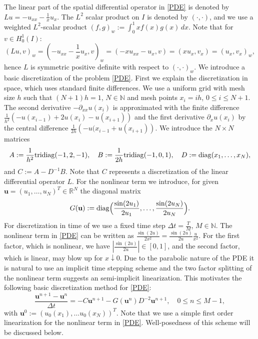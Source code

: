 \documentclass{siamltex}
\newcommand{\R}{\mathbb{R}}
\newcommand{\bu}{\mathbf u}
\begin{document}
  The linear part of the spatial differential operator in \eqref{PDE} is denoted by $Lu= - u_{xx}-\frac{1}{x}u_x$.
  The $L^2$ scalar product on $I$ is denoted by $(\cdot,\cdot)$, and  we use a weighted $L^2$-scalar product $(f,g)_w:=\int_0^1 x f(x)g(x)\, dx$.  Note that for  $v\in H^1_0(I)$: 
\begin{equation} \label{L2weighted}
 (Lu,v)_w=(-u_{xx} - \frac{1}{x}u_x,v)_w=(-x u_{xx} - u_x,v)=(xu_x,v_x)=(u_x,v_x)_w,
\end{equation}
hence $L$ is symmetric positive definite with respect to $(\cdot,\cdot)_w$. 
We introduce a basic discretization of the problem \eqref{PDE}. First we explain the discretization in space, which uses standard finite differences. We use a uniform grid with mesh size $h$ such that $(N+1)h=1$, $N \in \mathbb{N}$ and mesh points $x_i=ih$, $0 \leq i \leq N+1$. The second derivative $-\partial_{xx}u(x_i)$ is approximated with the finite difference $\tfrac{1}{h^2}\left(-u(x_{i-1}) + 2u(x_i) -u(x_{i+1})\right)$ and the first derivative $\partial_{x}u(x_i)$ by the central difference $\tfrac{1}{2h}\left(-u(x_{i-1}+u(x_{i+1})\right)$. We introduce the $N\times N$ matrices
\[
  A:=\frac{1}{h^2}{\rm tridiag}(-1,2,-1), \quad B:=\frac{1}{2h}{\rm tridiag}(-1,0,1),\quad D:={\rm diag}(x_1, \ldots,x_N),
\]
and $C:=A-D^{-1}B$. Note that $C$ represents a discretization of the linear differential operator $L$. 
For the nonlinear term we introduce, for given $\bu=(u_1, \ldots, u_N)^T\in \R^N$ the diagonal matrix 
\[
  G(\bu):={\rm diag}\Big( \frac{\sin (2u_1)}{2u_1}, \ldots, \frac{\sin (2u_N)}{2u_N}\Big). 
\]
For discretization in time of  we use a fixed time step $\Delta t=\frac{T}{M}$, $M \in \mathbb{N}$. The nonlinear term in  \eqref{PDE} can be written as $\frac{\sin(2u)}{2 x^2}=\frac{\sin(2u)}{2 u}\frac{u}{x^2}$. For the first factor, which is nonlinear, we have  $\left|\frac{\sin(2u)}{2 u}\right| \in [0,1]$, and the second factor, which is linear, may blow up for $x \downarrow 0$. Due to the parabolic nature of the PDE it is natural to use an implicit time stepping scheme and the two factor splitting of the nonlinear term suggests an semi-implicit  linearization.   
This motivates the following basic discretization method for \eqref{PDE}:
\begin{equation} \label{discrete}
 \frac{\bu^{n+1}-\bu^n}{\Delta t}= - C \bu^{n+1}-G(\bu^n)D^{-2}\bu^{n+1}, \quad 0 \leq n \leq M-1,
\end{equation}
with $\bu^0:=(u_0(x_1), \ldots u_0(x_N))^T$. Note that we use a simple first order linearization for the nonlinear term in \eqref{PDE}.
Well-posedness of this scheme will be discussed below.
\end{document}
